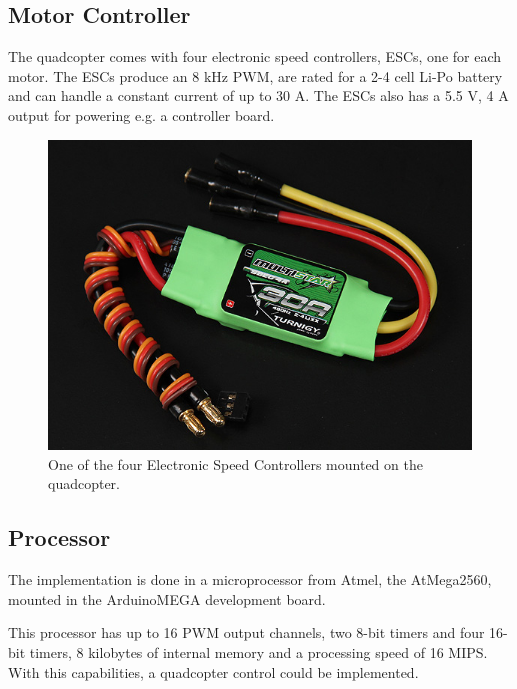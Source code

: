  
\subsection{Motor Controller}
The quadcopter comes with four electronic speed controllers, ESCs, one for each motor. The ESCs produce an 8 kHz PWM, are rated for a 2-4 cell Li-Po battery and can handle a constant current of up to 30 A. The ESCs also has a 5.5 V, 4 A output for powering e.g. a controller board.\cite{HKing}

\begin{figure}[H]
	\centering
	\includegraphics[scale=0.4]{figures/ESC}
	\caption{One of the four Electronic Speed Controllers mounted on the quadcopter.\cite{HKing}}
	\label{fig:esc}
\end{figure}
\subsection{Processor}
The implementation is done in a microprocessor from Atmel, the AtMega2560, mounted in the ArduinoMEGA development board.

This processor has up to 16 PWM output channels, two 8-bit timers and four 16-bit timers, 8 kilobytes of internal memory and a processing speed of 16 MIPS. With this capabilities, a quadcopter control could be implemented.

